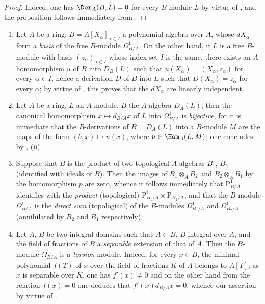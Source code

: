 \begin{proof}
Indeed, one has $\Der_A(B,L)=0$ for every $B$-module $L$ by virtue of , and the proposition follows immediately from .
\end{proof}

\begin{examples}[20.4.13]
\label{0.20.4.13}
\begin{enumerate}
  \item[\rm(i)] Let $A$ be a ring, $B=A[X_\alpha]_{\alpha\in I}$ a polynomial algebra over $A$, whose $dX_\alpha$ form a \emph{basis} of the free $B$-module $\Omega^1_{B/A}$.
On the other hand, if $L$ is a free $B$-module with basis $(z_\alpha)_{\alpha\in I}$ whose index set $I$ is the same, there exists an $A$-homomorphism $u$ of $B$ into $D_B(L)$ such that $u(X_\alpha)=(X_\alpha,z_\alpha)$ for every $\alpha\in I$, hence  a derivation $D$ of $B$ into $L$ such that $D(X_\alpha)=z_\alpha$ for every $\alpha$; by virtue of , this proves that the $dX_\alpha$ are linearly independent.
  \item[\rm(ii)] Let $A$ be a ring, $L$ an $A$-module, $B$ the $A$-algebra $D_A(L)$; then the canonical homomorphism $x\mapsto d_{B/A}x$ of $L$ into $\Omega^1_{B/A}$ is \emph{bijective}, for it is immediate that the $B$-derivations of $B=D_A(L)$ into a $B$-module $M$ are the maps of the form $(b,x)\mapsto u(x)$, where $u\in\Hom_A(L,M)$; one concludes by , (ii).
  \item[\rm(iii)] Suppose that $B$ is the product of two topological $A$-algebras $B_1$, $B_2$ (identified with ideals of $B$).
Then the images of $B_1\otimes_A B_2$ and $B_2\otimes_A B_1$ by the homomorphism $p$  are zero, whence it follows immediately that $\mathrm{P}^1_{B/A}$ identifies with the \emph{product} (topological) $\mathrm{P}^1_{B_1/A}\times\mathrm{P}^1_{B_2/A}$, and that the $B$-module $\Omega^1_{B/A}$ is the \emph{direct sum} (topological) of the $B$-modules $\Omega^1_{B_1/A}$ and $\Omega^1_{B_2/A}$ (annihilated by $B_2$ and $B_1$ respectively).
  \item[\rm(iv)] Let $A$, $B$ be two integral domains such that $A\subset B$, $B$ integral over $A$, and the field of fractions of $B$ a \emph{separable} extension of that of $A$.
Then the $B$-module $\Omega^1_{B/A}$ is a \emph{torsion} module.
Indeed, for every $x\in B$, the minimal polynomial $f(T)$ of $x$ over the field of fractions $K$ of $A$ belongs to $A[T]$; as $x$ is separable over $K$, one has $f'(x)\neq 0$ and on the other hand from the relation $f(x)=0$ one deduces that $f'(x)d_{B/A}x=0$, whence our assertion by virtue of .
\end{enumerate}
\end{examples}

